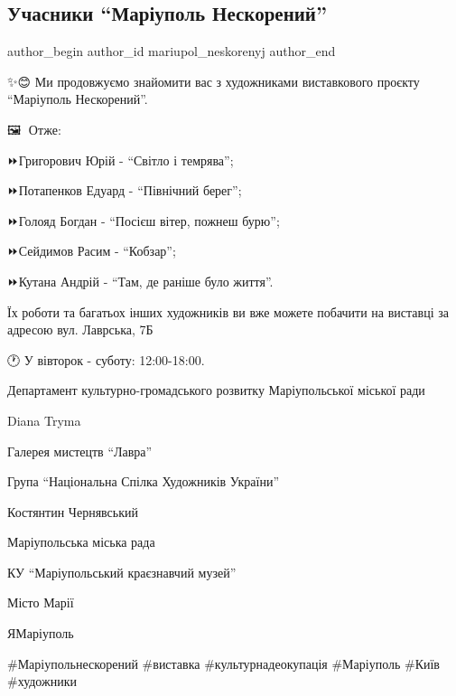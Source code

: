  
 
 
 
 

\subsection{Учасники \enquote{Маріуполь Нескорений}}
\label{sec:23_08_2023.fb.mariupol_neskorenyj.1.uchasnyky_mariupol_neskorenyj}

\ifcmt
 author_begin
   author_id mariupol_neskorenyj
 author_end
\fi

✨️😊 Ми продовжуємо знайомити вас з художниками виставкового проєкту \enquote{Маріуполь Нескорений}. \par
🖼🎨 Отже: \par
⏩️Григорович Юрій - \enquote{Світло і темрява};\par
⏩️Потапенков Едуард - \enquote{Північний берег};\par
⏩️Голояд Богдан - \enquote{Посієш вітер, пожнеш бурю};\par
⏩️Сейдимов Расим - \enquote{Кобзар};\par
⏩️Кутана Андрій - \enquote{Там, де раніше було життя}.\par
Їх роботи та багатьох інших художників ви вже можете побачити на виставці за адресою вул. Лаврська, 7Б\par
🕐 У вівторок - суботу: 12:00-18:00. \par
Департамент культурно-громадського розвитку Маріупольської міської ради \par
Diana Tryma \par
Галерея мистецтв \enquote{Лавра} \par
Група \enquote{Національна Спілка Художників України} \par
Костянтин Чернявський \par
Маріупольська міська рада \par
КУ \enquote{Маріупольський краєзнавчий музей} \par
Місто Марії \par
ЯМаріуполь \par
\#Маріупольнескорений \#виставка \#культурнадеокупація \#Маріуполь \#Київ \#художники\par
